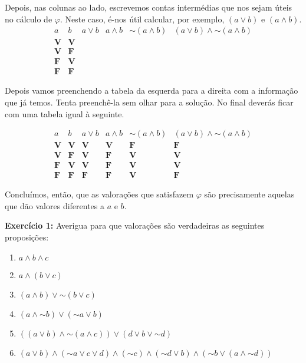 \documentclass{article}
\theoremstyle{definition}
\theoremstyle{remark}
\newcommand{\V}{\mathbf{V}}
\newcommand{\F}{\mathbf{F}}
\newcommand*{\lneg}{\mathord{\sim}}
\begin{document}
	Depois, nas colunas ao lado, escrevemos contas intermédias que nos sejam úteis no cálculo de $\varphi$. Neste caso, é-nos útil calcular, por exemplo, $(a \lor b)$ e $(a \land b)$.
	\[
	\begin{array}{c|c|c|c|c|c}
	a & b & a \lor b & a \land b & \lneg (a \land b) & (a \lor b) \land \lneg (a \land b)\\
	\hline
	\V & \V &&&\\
	\V & \F &&&\\
	\F & \V &&&\\
	\F & \F &&&
	\end{array}
	\]
	
	Depois vamos preenchendo a tabela da esquerda para a direita com a informação que já temos. Tenta preenchê-la sem olhar para a solução. No final deverás ficar com uma tabela igual à seguinte.
	
	\[
	\begin{array}{c|c|c|c|c|c}
	a & b & a \lor b & a \land b & \lneg (a \land b) & (a \lor b) \land \lneg (a \land b)\\
	\hline
	\V & \V &\V&\V&\F&\F\\
	\V & \F &\V&\F&\V&\V\\
	\F & \V &\V&\F&\V&\V\\
	\F & \F &\F&\F&\V&\F
	\end{array}
	\]
	
	Concluímos, então, que as valorações que satisfazem $\varphi$ são precisamente aquelas que dão valores diferentes a $a$ e $b$.
	
	\medskip
	
	\textbf{Exercício 1:} Averigua para que valorações são verdadeiras as seguintes proposições:
	
	\begin{enumerate}
	\item $a \land b \land c$
	
	\item $a \land (b \lor c)$
	
	\item $(a \land b) \lor \lneg (b \lor c)$
	
	\item $(a \land \lneg b) \lor (\lneg a \lor b)$
	
	\item $((a \lor b) \land \lneg (a \land c)) \lor (d \lor b \lor \lneg d)$
	
	\item $(a \lor b) \land (\lneg a \lor c \lor d) \land (\lneg c) \land (\lneg d \lor b) \land (\lneg b \lor (a \land \lneg d))$
	\end{enumerate}
	
\end{document}

